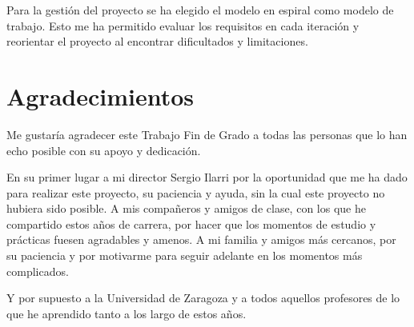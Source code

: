 Para la gestión del proyecto se ha elegido el modelo en espiral como modelo de trabajo. Esto me ha permitido evaluar los requisitos en cada iteración y reorientar el proyecto al encontrar dificultados y limitaciones.

\cleardoublepage


\thispagestyle{empty}


\chapter*{Agradecimientos}
\thispagestyle{empty}

       \vspace{1cm}


Me gustaría agradecer este Trabajo Fin de Grado a todas las personas que lo han echo posible con su apoyo y dedicación.

\vspace{1cm}
En su primer lugar a mi director Sergio Ilarri por la oportunidad que me ha dado para realizar este proyecto, su paciencia y ayuda, sin la cual este proyecto no hubiera sido posible. A mis compañeros y amigos de clase, con los que he compartido estos años de carrera, por hacer que los momentos de estudio y prácticas fuesen agradables y amenos. A mi familia y amigos más cercanos, por su paciencia y por motivarme para seguir adelante en los momentos más complicados.

\vspace{1cm}
Y por supuesto a la Universidad de Zaragoza y a todos aquellos profesores de lo que he aprendido tanto a los largo de estos años.

\cleardoublepage
